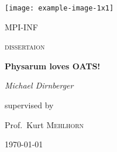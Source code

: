 
\begin{titlepage}
	\centering
	\texttt{[image: example-image-1x1]}\par\vspace{1cm}
	{\scshape\LARGE MPI-INF \par}
	\vspace{1cm}
	{\scshape\Large dissertaion\par}
	\vspace{1.5cm}
	{\huge\bfseries Physarum loves OATS!\par}
	\vspace{2cm}
	{\Large\itshape Michael Dirnberger\par}
	\vfill
	supervised by\par
	Prof.~Kurt \textsc{Mehlhorn}

	\vfill

	{\large \today\par}
\end{titlepage}